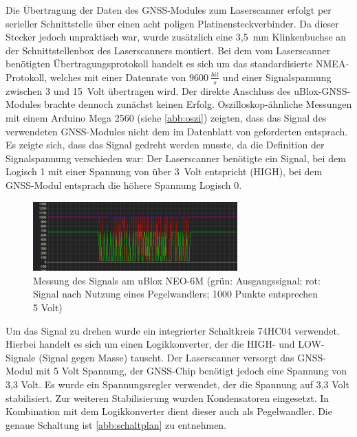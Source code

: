 \documentclass[a4paper,12pt,bibliography=totoc, listof=totoc,titlepage,pointlessnumbers]{scrreprt}
\begin{document}
Die Übertragung der Daten des GNSS-Modules zum Laser\-scan\-ner erfolgt per serieller Schnittstelle über einen acht poligen Platinensteckverbinder. Da dieser Stecker jedoch unpraktisch war, wurde zusätzlich eine 3,5~mm Klinkenbuchse an der Schnittstellenbox des Laser\-scan\-ners montiert. Bei dem vom Laser\-scan\-ner benötigten Übertragungsprotokoll handelt es sich um das standardisierte NMEA-Protokoll, welches mit einer Datenrate von \(9600~\frac{bit}{s}\) und einer Signalspannung zwischen 3 und 15~Volt übertragen wird. Der direkte Anschluss des uBlox-GNSS-Modules brachte dennoch zunächst keinen Erfolg. Oszilloskop-ähnliche Messungen mit einem Arduino Mega 2560 (siehe \autoref{abb:oszi}) zeigten, dass das Signal des verwendeten GNSS-Modules nicht dem im Datenblatt von \citet[S. 3]{vlpInterface} geforderten entsprach. Es zeigte sich, dass das Signal gedreht werden musste, da die Definition der Signalspannung verschieden war: Der Laser\-scan\-ner benötigte ein Signal, bei dem Logisch 1 mit einer Spannung von über 3~Volt \citep[S. 3]{vlpInterface} entspricht (HIGH), bei dem GNSS-Modul entsprach die höhere Spannung Logisch 0.

\begin{figure}[!ht]
 \centering
 \includegraphics[width=0.7\textwidth]{img/oszi.png}
 \caption{Messung des Signals am uBlox NEO-6M (grün: Ausgangssignal; rot: Signal nach Nutzung eines Pegelwandlers; 1000 Punkte entsprechen 5 Volt)}
 \label{abb:oszi}
\end{figure}

Um das Signal zu drehen wurde ein integrierter Schaltkreis 74HC04 verwendet. Hierbei handelt es sich um einen Logikkonverter, der die HIGH- und LOW-Signale (Signal gegen Masse) tauscht. Der Laser\-scan\-ner versorgt das GNSS-Modul mit 5 Volt Spannung, der GNSS-Chip benötigt jedoch eine Spannung von 3,3 Volt. Es wurde ein Spannungsregler verwendet, der die Spannung auf 3,3 Volt stabilisiert. Zur weiteren Stabilisierung wurden Kondensatoren eingesetzt. In Kombination mit dem Logikkonverter dient dieser auch als Pegelwandler. Die genaue Schaltung ist \autoref{abb:schaltplan} zu entnehmen.
\end{document}
